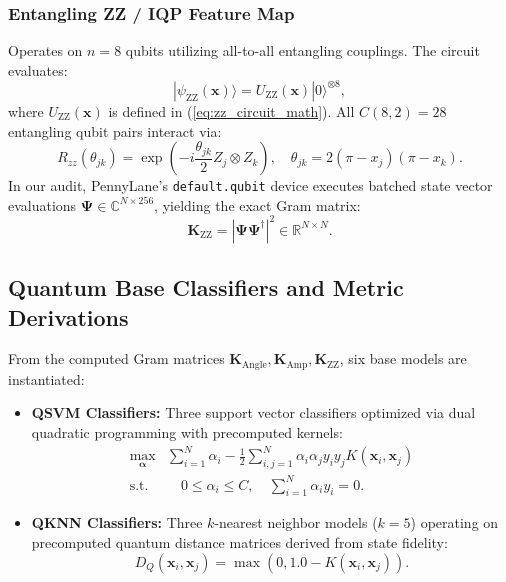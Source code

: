 \documentclass[journal,twocolumn]{IEEEtran}
\begin{document}
\subsubsection{Entangling ZZ / IQP Feature Map}
Operates on $n=8$ qubits utilizing all-to-all entangling couplings. The circuit evaluates:
\begin{equation}
|\psi_{\text{ZZ}}(\mathbf{x})\rangle = U_{\text{ZZ}}(\mathbf{x}) |0\rangle^{\otimes 8},
\end{equation}
where $U_{\text{ZZ}}(\mathbf{x})$ is defined in (\ref{eq:zz_circuit_math}). All $C(8, 2) = 28$ entangling qubit pairs interact via:
\begin{equation}
R_{zz}(\theta_{jk}) = \exp\left(-i \frac{\theta_{jk}}{2} Z_j \otimes Z_k\right), \quad \theta_{jk} = 2(\pi - x_j)(\pi - x_k).
\end{equation}
In our audit, PennyLane's \texttt{default.qubit} device executes batched state vector evaluations $\mathbf{\Psi} \in \mathbb{C}^{N \times 256}$, yielding the exact Gram matrix:
\begin{equation}
\mathbf{K}_{\text{ZZ}} = |\mathbf{\Psi} \mathbf{\Psi}^{\dagger}|^2 \in \mathbb{R}^{N \times N}.
\end{equation}

\subsection{Quantum Base Classifiers and Metric Derivations}
From the computed Gram matrices $\mathbf{K}_{\text{Angle}}, \mathbf{K}_{\text{Amp}}, \mathbf{K}_{\text{ZZ}}$, six base models are instantiated:
\begin{itemize}
    \item \textbf{QSVM Classifiers:} Three support vector classifiers optimized via dual quadratic programming with precomputed kernels:
    \begin{align}
    \max_{\bm{\alpha}} & \sum_{i=1}^N \alpha_i - \frac{1}{2} \sum_{i,j=1}^N \alpha_i \alpha_j y_i y_j K(\mathbf{x}_i, \mathbf{x}_j) \nonumber \\
    \text{s.t.} & \quad 0 \le \alpha_i \le C, \quad \sum_{i=1}^N \alpha_i y_i = 0.
    \end{align}
    \item \textbf{QKNN Classifiers:} Three $k$-nearest neighbor models ($k=5$) operating on precomputed quantum distance matrices derived from state fidelity:
    \begin{equation}
    D_Q(\mathbf{x}_i, \mathbf{x}_j) = \max(0, 1.0 - K(\mathbf{x}_i, \mathbf{x}_j)).
    \label{eq:quantum_distance}
    \end{equation}
\end{itemize}
\end{document}
